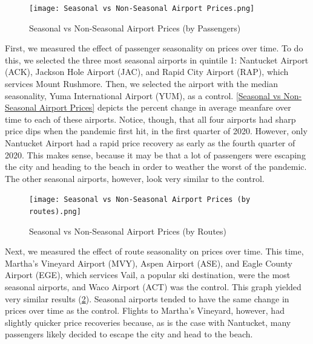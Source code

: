 \documentclass[11pt]{article}
\begin{document}
\begin{figure}
    \centering
    \texttt{[image: Seasonal vs Non-Seasonal Airport Prices.png]}
    \caption{Seasonal vs Non-Seasonal Airport Prices (by Passengers)}
    \label{fig:Seasonal vs Non-Seasonal Airport Prices (by Passengers)}
\end{figure}
First, we measured the effect of passenger seasonality on prices over time. To do this, we selected the three most seasonal airports in quintile 1: Nantucket Airport (ACK), Jackson Hole Airport (JAC), and Rapid City Airport (RAP), which services Mount Rushmore. Then, we selected the airport with the median seasonality, Yuma International Airport (YUM), as a control. \cref{Seasonal vs Non-Seasonal Airport Prices} depicts the percent change in average meanfare over time to each of these airports. Notice, though, that all four airports had sharp price dips when the pandemic first hit, in the first quarter of 2020. However, only Nantucket Airport had a rapid price recovery as early as the fourth quarter of 2020. This makes sense, because it may be that a lot of passengers were escaping the city and heading to the beach in order to weather the worst of the pandemic. The other seasonal airports, however, look very similar to the control.
\begin{figure}
    \centering
    \texttt{[image: Seasonal vs Non-Seasonal Airport Prices (by routes).png]}
    \caption{Seasonal vs Non-Seasonal Airport Prices (by Routes)}
    \label{Seasonal vs Non-Seasonal Airport Prices (by Routes)}
\end{figure}
Next, we measured the effect of route seasonality on prices over time. This time, Martha’s Vineyard Airport (MVY), Aspen Airport (ASE), and Eagle County Airport (EGE), which services Vail, a popular ski destination, were the most seasonal airports, and Waco Airport (ACT) was the control. This graph yielded very similar results (\cref{Seasonal vs Non-Seasonal Airport Prices (by Routes)}). Seasonal airports tended to have the same change in prices over time as the control. Flights to Martha’s Vineyard, however, had slightly quicker price recoveries because, as is the case with Nantucket, many passengers likely decided to escape the city and head to the beach.
\end{document}
